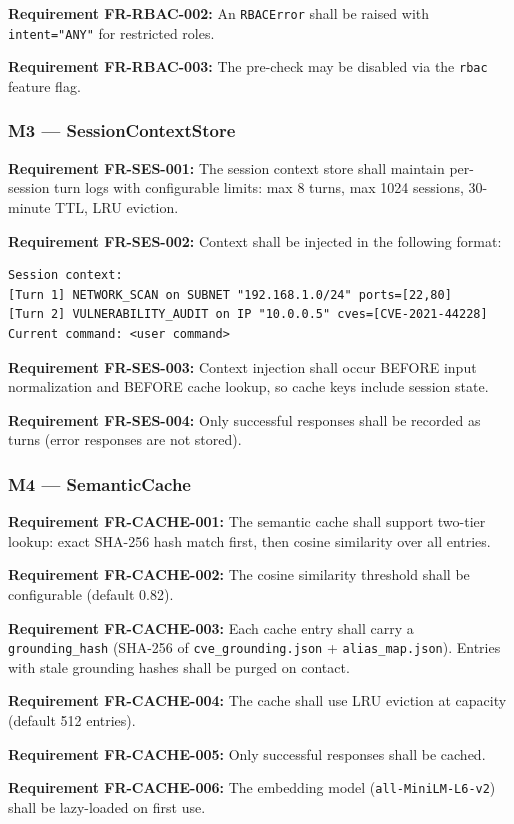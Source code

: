 \documentclass[10pt,journal,onecolumn]{IEEEtran}
\newcommand{\reqid}[1]{\textbf{#1}}
\begin{document}
\reqid{Requirement FR-RBAC-002:} An \texttt{RBACError} shall be raised with \texttt{intent="ANY"} for restricted roles.

\reqid{Requirement FR-RBAC-003:} The pre-check may be disabled via the \texttt{rbac} feature flag.

\subsubsection{M3 --- SessionContextStore}
\reqid{Requirement FR-SES-001:} The session context store shall maintain per-session turn logs with configurable limits: max 8 turns, max 1024 sessions, 30-minute TTL, LRU eviction.

\reqid{Requirement FR-SES-002:} Context shall be injected in the following format:
\begin{lstlisting}
Session context:
[Turn 1] NETWORK_SCAN on SUBNET "192.168.1.0/24" ports=[22,80]
[Turn 2] VULNERABILITY_AUDIT on IP "10.0.0.5" cves=[CVE-2021-44228]
Current command: <user command>
\end{lstlisting}

\reqid{Requirement FR-SES-003:} Context injection shall occur BEFORE input normalization and BEFORE cache lookup, so cache keys include session state.

\reqid{Requirement FR-SES-004:} Only successful responses shall be recorded as turns (error responses are not stored).

\subsubsection{M4 --- SemanticCache}
\reqid{Requirement FR-CACHE-001:} The semantic cache shall support two-tier lookup: exact SHA-256 hash match first, then cosine similarity over all entries.

\reqid{Requirement FR-CACHE-002:} The cosine similarity threshold shall be configurable (default 0.82).

\reqid{Requirement FR-CACHE-003:} Each cache entry shall carry a \texttt{grounding\_hash} (SHA-256 of \texttt{cve\_grounding.json} + \texttt{alias\_map.json}). Entries with stale grounding hashes shall be purged on contact.

\reqid{Requirement FR-CACHE-004:} The cache shall use LRU eviction at capacity (default 512 entries).

\reqid{Requirement FR-CACHE-005:} Only successful responses shall be cached.

\reqid{Requirement FR-CACHE-006:} The embedding model (\texttt{all-MiniLM-L6-v2}) shall be lazy-loaded on first use.
\end{document}
